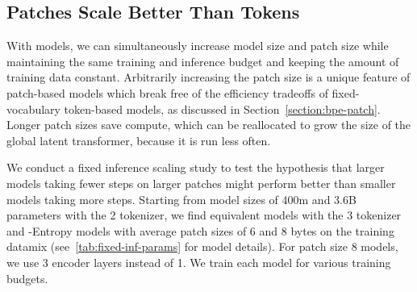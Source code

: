 \documentclass[]{fairmeta}
\begin{document}
\begin{table}[t]
    \centering
    \caption{Details of models used in the fixed-inference scaling study. We report non-embedding parameters for each model and their relative number compared to \llama{} 2. We pick model sizes with equal inference \flop{}s per byte. We also indicate BPE's compute-optimal training data quantity and the crossover point where \model{} surpasses BPE as seen in \autoref{fig:fixed_inference_scaling} (both expressed in bytes of training data). This point is achieved at much smaller scales compared to many modern training budgets.}
    \label{tab:fixed-inf-params}
\end{table}

\subsection{Patches Scale Better Than Tokens}
With \model{} models, we can simultaneously increase model size and patch size while maintaining the same training and inference \flop{} budget and keeping the amount of training data constant. Arbitrarily increasing the patch size is a unique feature of patch-based models which break free of the efficiency tradeoffs of fixed-vocabulary token-based models, as discussed in Section~\ref{section:bpe-patch}. Longer patch sizes save compute, which can be reallocated to grow the size of the global latent transformer, because it is run less often.




We conduct a fixed inference scaling study to test the hypothesis that larger models taking fewer steps on larger patches might perform better than smaller models taking more steps. Starting from model sizes of 400m and 3.6B parameters with the \llama{} 2 tokenizer, we find \flop{} equivalent models with the \llama{} 3 tokenizer and \model{}-Entropy models with average patch sizes of 6 and 8 bytes on the training datamix (see~\autoref{tab:fixed-inf-params} for model details). For patch size 8 models, we use 3 encoder layers instead of 1. We train each model for various training \flop{} budgets.
\end{document}
